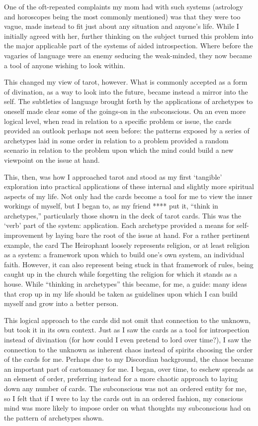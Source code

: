 One of the oft-repeated complaints my mom had with such systems (astrology and horoscopes being the most commonly mentioned) was that they were too vague, made instead to fit just about any situation and anyone's life. While I initially agreed with her, further thinking on the subject turned this problem into the major applicable part of the systems of aided introspection. Where before the vagaries of language were an enemy seducing the weak-minded, they now became a tool of anyone wishing to look within.

This changed my view of tarot, however. What is commonly accepted as a form of divination, as a way to look into the future, became instead a mirror into the self. The subtleties of language brought forth by the applications of archetypes to oneself made clear some of the goings-on in the subconscious. On an even more logical level, when read in relation to a specific problem or issue, the cards provided an outlook perhaps not seen before: the patterns exposed by a series of archetypes laid in some order in relation to a problem provided a random scenario in relation to the problem upon which the mind could build a new viewpoint on the issue at hand.

This, then, was how I approached tarot and stood as my first `tangible' exploration into practical applications of these internal and slightly more spiritual aspects of my life. Not only had the cards become a tool for me to view the inner workings of myself, but I began to, as my friend **** put it, ``think in archetypes,'' particularly those shown in the deck of tarot cards. This was the `verb' part of the system: application. Each archetype provided a means for self-improvement by laying bare the root of the issue at hand. For a rather pertinent example, the card The Heirophant loosely represents religion, or at least religion as a system: a framework upon which to build one's own system, an individual faith. However, it can also represent being stuck in that framework of rules, being caught up in the church while forgetting the religion for which it stands as a house. While ``thinking in archetypes'' this became, for me, a guide: many ideas that crop up in my life should be taken as guidelines upon which I can build myself and grow into a better person.

This logical approach to the cards did not omit that connection to the unknown, but took it in its own context. Just as I saw the cards as a tool for introspection instead of divination (for how could I even pretend to lord over time?), I saw the connection to the unknown as inherent chaos instead of spirits choosing the order of the cards for me. Perhaps due to my Discordian background, the chaos became an important part of cartomancy for me. I began, over time, to eschew spreads as an element of order, preferring instead for a more chaotic approach to laying down any number of cards. The subconscious was not an ordered entity for me, so I felt that if I were to lay the cards out in an ordered fashion, my conscious mind was more likely to impose order on what thoughts my subconscious had on the pattern of archetypes shown.

